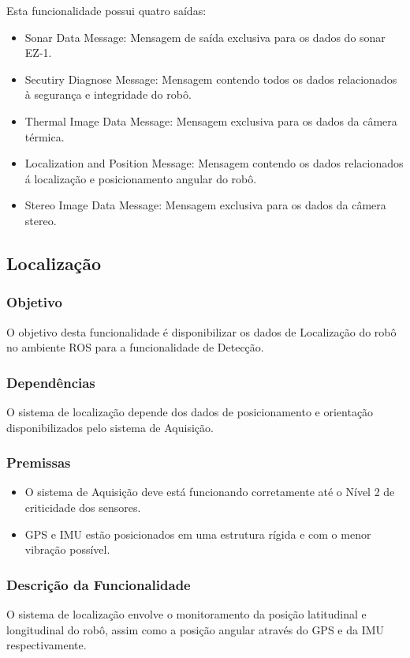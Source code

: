      Esta funcionalidade possui quatro saídas:
     
    \begin{itemize}
        	\item Sonar Data Message: Mensagem de saída exclusiva para os dados do sonar EZ-1.
            \item Secutiry Diagnose Message: Mensagem contendo todos os dados relacionados à segurança e integridade do robô.
            \item Thermal Image Data Message: Mensagem exclusiva para os dados da câmera térmica.
            \item Localization and Position Message: Mensagem contendo os dados relacionados á localização e posicionamento angular do robô.
            \item Stereo Image Data Message: Mensagem exclusiva para os dados da câmera stereo.
        \end{itemize}
\pagebreak
\subsection{Localização}
\label{ssec:func2}
    \subsubsection{Objetivo}
        O objetivo desta funcionalidade é disponibilizar os dados de Localização do robô no ambiente ROS para a funcionalidade de Detecção.

    \subsubsection{Dependências}
        O sistema de localização depende dos dados de posicionamento e orientação disponibilizados pelo sistema de Aquisição.

    \subsubsection{Premissas}
        \begin{itemize}
         	\item O sistema de Aquisição deve está funcionando corretamente até o Nível 2 de criticidade dos sensores.
             \item GPS e IMU estão posicionados em uma estrutura rígida e com o menor vibração possível.
        \end{itemize}
        
    \subsubsection{Descrição da Funcionalidade}
        O sistema de localização envolve o monitoramento da posição latitudinal e longitudinal do robô, assim como a posição angular através do GPS e da IMU respectivamente.
        
